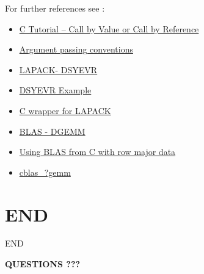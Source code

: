 \documentclass[xcolor=x11names,compress]{beamer}
\renewcommand{\(}{\begin{columns}}
\renewcommand{\)}{\end{columns}}
\newcommand{\<}[1]{\begin{column}{#1}}
\renewcommand{\>}{\end{column}}
\begin{document}
\begin{frame}[fragile]{For further references see :}
\begin{scriptsize}
\begin{itemize}
\item \href{https://www.codingunit.com/c-tutorial-call-by-value-or-call-by-reference}{C Tutorial – Call by Value or Call by Reference}
\item \href{https://gcc.gnu.org/onlinedocs/gcc-4.9.2/gfortran/Argument-passing-conventions.html}{Argument passing conventions}
\item \href{http://www.netlib.org/lapack/explore-html/d2/d8a/group__double_s_yeigen_ga2ad9f4a91cddbf67fe41b621bd158f5c.html#ga2ad9f4a91cddbf67fe41b621bd158f5c}{LAPACK- DSYEVR}
\item \href{https://software.intel.com/sites/products/documentation/doclib/mkl_sa/11/mkl_lapack_examples/dsyevr.htm}{DSYEVR Example}
\item \href{http://www.netlib.org/lapack/lapwrapc/}{C wrapper for LAPACK}
\item \href{http://www.netlib.org/lapack/explore-html/d1/d54/group__double__blas__level3_gaeda3cbd99c8fb834a60a6412878226e1.html#gaeda3cbd99c8fb834a60a6412878226e1}{BLAS - DGEMM}
\item \href{https://www.christophlassner.de/using-blas-from-c-with-row-major-data.html}{Using BLAS from C with row major data}
\item \href{https://software.intel.com/en-us/node/520775}{cblas\_?gemm}
\end{itemize}
\end{scriptsize}
\end{frame}
\section{END}
\begin{frame}{END}
  \begin{center}
  \Large\textbf{QUESTIONS ???}
  \end{center}
\end{frame}
\end{document}

